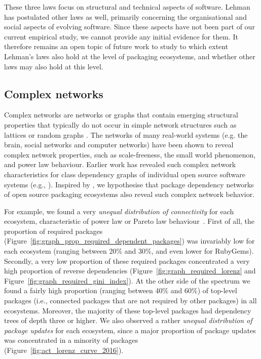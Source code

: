 \documentclass[smallextended]{svjour3}       %
\newcommand{\fig}[1]{Figure~\ref{#1}}
\newcommand{\rubygems}{\textsf{RubyGems}\xspace}
\begin{document}
These three laws focus on structural and technical aspects of software. Lehman has postulated other laws as well, primarily concerning the organisational and social aspects of evolving software. Since these aspects have not been part of our current empirical study, we cannot provide any initial evidence for them.
It therefore remains an open topic of future work to study to which extent Lehman's laws also hold at the level of packaging ecosystems, and whether other laws may also hold at this level.

\subsection{Complex networks}
\label{sec:complexnetworks}

Complex networks are networks or graphs that contain emerging structural properties that typically do not occur in simple network structures such as lattices or random graphs \cite{Barabasi2016}. The networks of many real-world systems (e.g. the brain, social networks and computer networks) have been shown to reveal complex network properties, such as scale-freeness, the small world phenomenon, and power law behaviour. Earlier work has revealed such complex network characteristics for class dependency graphs of individual open source software systems (e.g., \cite{Myers2003Software, Zheng2008}).
Inspired by \cite{Cataldo2014}, we hypothesise that package dependency networks of open source packaging ecosystems also reveal such complex network behavior.

For example, we found a very \emph{unequal distribution of connectivity} for each ecosystem, characteristic of power law or Pareto law behaviour~\cite{Goeminne2011-SQM}. First of all, the proportion of required packages (\fig{fig:graph_prop_required_dependent_packages}) was invariably low for each ecosystem (ranging between 20\% and 30\%, and even lower for \rubygems). Secondly, a very low proportion of these required packages concentrated a very high proportion of reverse dependencies (\fig{fig:graph_required_lorenz} and \fig{fig:graph_required_gini_index}). At the other side of the spectrum we found a fairly high proportion (ranging between 40\% and 60\%) of top-level packages (i.e., connected packages that are not required by other packages) in all ecosystems. Moreover, the majority of these top-level packages had dependency trees of depth three or higher. 
We also observed a rather \emph{unequal distribution of package updates} for each ecosystem, since a major proportion of package updates was concentrated in a minority of packages (\fig{fig:act_lorenz_curve_2016}).
\end{document}
